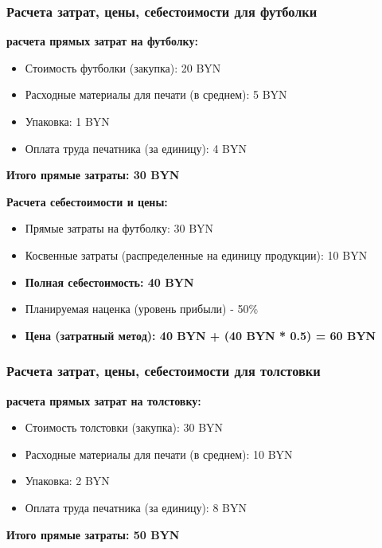 \subsubsection{Расчета затрат, цены, себестоимости для футболки}

\textbf{расчета прямых затрат на футболку:}

\begin{itemize}[noitemsep]
    \item Стоимость футболки (закупка): 20 BYN
    \item Расходные материалы для печати (в среднем): 5 BYN
    \item Упаковка: 1 BYN
    \item Оплата труда печатника (за единицу): 4 BYN
\end{itemize}

\textbf{Итого прямые затраты: 30 BYN}

\textbf{Расчета себестоимости и цены:}

\begin{itemize}[noitemsep]
\item Прямые затраты на футболку: 30 BYN
\item Косвенные затраты (распределенные на единицу продукции): 10 BYN
\item \textbf{Полная себестоимость: 40 BYN}
\item Планируемая наценка (уровень прибыли) - 50\%
\item \textbf{Цена (затратный метод): 40 BYN + (40 BYN * 0.5) = 60 BYN}
\end{itemize}

\subsubsection{Расчета затрат, цены, себестоимости для толстовки}

\textbf{расчета прямых затрат на толстовку:}

\begin{itemize}[noitemsep]
    \item Стоимость толстовки (закупка): 30 BYN
    \item Расходные материалы для печати (в среднем): 10 BYN
    \item Упаковка: 2 BYN
    \item Оплата труда печатника (за единицу): 8 BYN
\end{itemize}

\textbf{Итого прямые затраты: 50 BYN}

